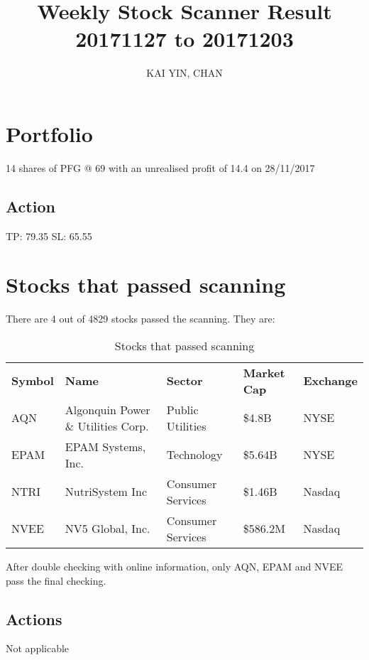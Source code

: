 \documentclass{article}
\begin{document}
\title{Weekly Stock Scanner Result \\ 20171127 to 20171203}
\author{KAI YIN, CHAN}
\maketitle

\section{Portfolio}
14 shares of PFG @ 69 with an unrealised profit of 14.4 on 28/11/2017

\subsection{Action}
TP: 79.35 SL: 65.55

\section{Stocks that passed scanning}

There are 4 out of 4829 stocks passed the scanning.  They are:
\begin{table}[htbp]
  \caption{Stocks that passed scanning}
    \begin{tabular}{lllll}
    \textbf{Symbol} & \textbf{Name} & \textbf{Sector} & \textbf{Market Cap} & \textbf{Exchange} \\
    AQN   & Algonquin Power \& Utilities Corp. & Public Utilities & \$4.8B & NYSE \\
    EPAM  & EPAM Systems, Inc. & Technology & \$5.64B & NYSE \\
    NTRI  & NutriSystem Inc & Consumer Services & \$1.46B & Nasdaq \\
    NVEE  & NV5 Global, Inc. & Consumer Services & \$586.2M & Nasdaq \\
    \end{tabular}%
  \label{tab:addlabel}%
\end{table}%

After double checking with online information, only AQN, EPAM and NVEE pass the final checking.

\subsection{Actions}
Not applicable
\end{document}
